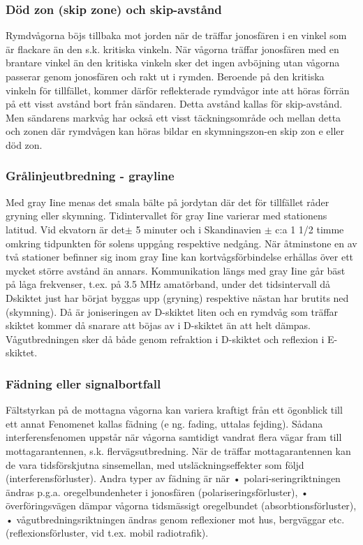 \subsubsection{Död zon (skip zone) och skip-avstånd}

Rymdvågorna böjs tillbaka mot jorden när
de träffar jonosfären i en vinkel som är
flackare än den s.k. kritiska vinkeln. När
vågorna träffar jonosfären med en brantare
vinkel än den kritiska vinkeln sker det ingen
avböjning utan vågorna passerar genom
jonosfären och rakt ut i rymden. Beroende
på den kritiska vinkeln för tillfället, kommer
därför reflekterade rymdvågor inte att höras
förrän på ett visst avstånd bort från sändaren. Detta avstånd kallas för skip-avstånd.
Men sändarens markvåg har också ett
visst täckningsområde och mellan detta och
zonen där rymdvågen kan höras bildar en
skymningszon-en skip zon e eller död zon.

\subsubsection{Grålinjeutbredning - grayline}

Med gray Iine menas det smala bälte på
jordytan där det för tillfället råder gryning
eller skymning.
Tidintervallet för gray Iine varierar med
stationens latitud. Vid ekvatorn är det\(\pm\) 5
minuter och i Skandinavien \(\pm\) c:a 1 1/2
timme omkring tidpunkten för solens uppgång respektive nedgång.
När åtminstone en av två stationer befinner sig inom gray Iine kan kortvågsförbindelse erhållas över ett mycket större
avstånd än annars.
Kommunikation längs med gray Iine går
bäst på låga frekvenser, t.ex. på 3.5 MHz
amatörband, under det tidsintervall då Dskiktet just har börjat byggas upp (gryning)
respektive nästan har brutits ned (skymning). Då är joniseringen av D-skiktet liten
och en rymdvåg som träffar skiktet kommer
då snarare att böjas av i D-skiktet än att helt
dämpas. Vågutbredningen sker då både
genom refraktion i D-skiktet och reflexion i
E-skiktet.

\subsubsection{Fädning eller signalbortfall}

Fältstyrkan på de mottagna vågorna kan
variera kraftigt från ett ögonblick till ett annat
Fenomenet kallas fädning (e ng. fading, uttalas fejding).
Sådana interferensfenomen uppstår när
vågorna samtidigt vandrat flera vägar fram
till mottagarantennen, s.k. flervägsutbredning. När de träffar mottagarantennen kan
de vara tidsförskjutna sinsemellan, med utsläckningseffekter som följd (interferensförluster).
Andra typer av fädning är när
• polari-seringriktningen ändras p.g.a. oregelbundenheter i jonosfären (polariseringsförluster),
• överföringsvägen dämpar vågorna tidsmässigt oregelbundet (absorbtionsförluster),
• vågutbredningsriktningen ändras genom
reflexioner mot hus, bergväggar etc.
(reflexionsförluster, vid t.ex. mobil radiotrafik).

